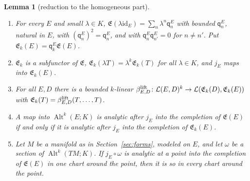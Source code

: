 \documentclass[11pt]{amsart}
\newtheorem{lemma}[theorem]{Lemma}
\theoremstyle{definition}
\theoremstyle{remark}
\numberwithin{equation}{section}
\newcommand{\cL}{\mathcal L}
\newcommand{\Alt}{\operatorname{Alt}}
\newcommand{\id}{\mathrm{id}}
\theoremstyle{plain}
\theoremstyle{definition}
\theoremstyle{plain}
\begin{document}
\begin{lemma}[reduction to the homogeneous part]\label{amb:lem:homogeneous}
\leavevmode
\begin{enumerate}
\item For every $E$ and small $\lambda\in K$, $\mathfrak E(\lambda\id_E)=\sum_n\lambda^n\mathsf q_n^E$ with bounded $\mathsf q_n^E$, natural in $E$, with $(\mathsf q_n^E)^2=\mathsf q_n^E$, and with $\mathsf q_n^E\mathsf q_{n'}^E=0$ for $n\ne n'$. Put $\mathfrak E_k(E)=\mathsf q_k^E\mathfrak E(E)$.
\item $\mathfrak E_k$ is a subfunctor of $\mathfrak E$, $\mathfrak E_k(\lambda T)=\lambda^k\mathfrak E_k(T)$ for all $\lambda\in K$, and $j_E$ maps into $\mathfrak E_k(E)$.
\item For all $E,D$ there is a bounded $k$-linear $\beta^{\rm lift}_{E,D}\colon\cL(E,D)^k\to\cL(\mathfrak E_k(D),\mathfrak E_k(E))$ with $\mathfrak E_k(T)=\beta^{\rm lift}_{E,D}(T,\dots,T)$.
\item A map into $\Alt^k(E;K)$ is analytic after $j_E$ into the completion of $\mathfrak E(E)$ if and only if it is analytic after $j_E$ into the completion of $\mathfrak E_k(E)$.
\item Let $M$ be a manifold as in Section~\ref{sec:forms}, modeled on $E$, and let $\omega$ be a section of $\Alt^k(TM;K)$. If $j_E\circ\omega$ is analytic at a point into the completion of $\mathfrak E(E)$ in one chart around the point, then it is so in every chart around the point.
\end{enumerate}
\end{lemma}
\end{document}
